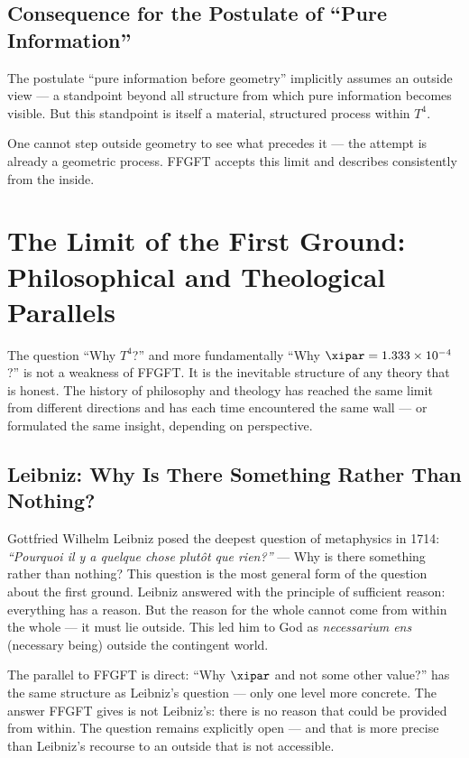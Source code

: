 \subsection{Consequence for the Postulate of ``Pure Information''}

The postulate ``pure information before geometry'' implicitly assumes an outside view --- a standpoint beyond all structure from which pure information becomes visible. But this standpoint is itself a material, structured process within $T^4$.

One cannot step outside geometry to see what precedes it --- the attempt is already a geometric process. FFGFT accepts this limit and describes consistently from the inside.

\section{The Limit of the First Ground: Philosophical and Theological Parallels}

The question ``Why $T^4$?'' and more fundamentally ``Why $\xipar = 1.333 \times 10^{-4}$?'' is not a weakness of FFGFT. It is the inevitable structure of any theory that is honest. The history of philosophy and theology has reached the same limit from different directions and has each time encountered the same wall --- or formulated the same insight, depending on perspective.

\subsection{Leibniz: Why Is There Something Rather Than Nothing?}

Gottfried Wilhelm Leibniz posed the deepest question of metaphysics in 1714: \emph{``Pourquoi il y a quelque chose plutôt que rien?''} --- Why is there something rather than nothing? \cite{Leibniz1714} This question is the most general form of the question about the first ground. Leibniz answered with the principle of sufficient reason: everything has a reason. But the reason for the whole cannot come from within the whole --- it must lie outside. This led him to God as \emph{necessarium ens} (necessary being) outside the contingent world.

The parallel to FFGFT is direct: ``Why $\xipar$ and not some other value?'' has the same structure as Leibniz's question --- only one level more concrete. The answer FFGFT gives is not Leibniz's: there is no reason that could be provided from within. The question remains explicitly open --- and that is more precise than Leibniz's recourse to an outside that is not accessible.

